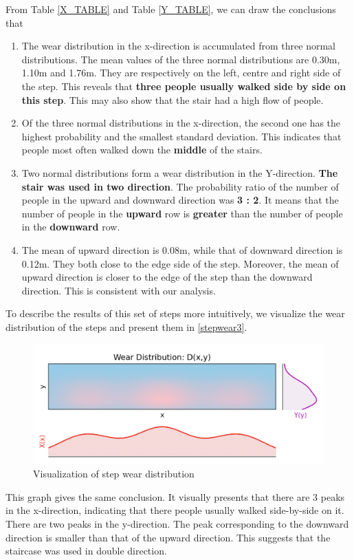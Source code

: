 \documentclass[12pt]{article}  %
\numberwithin{equation}{section} %
\begin{document}
From  Table \ref{X_TABLE} and Table \ref{Y_TABLE}, we can draw the conclusions that
\begin{enumerate}[\bfseries 1.]
	\setlength{\parsep}{0ex} %
	\setlength{\topsep}{-1ex} %
	\setlength{\itemsep}{0ex} %
	\item The wear distribution in the x-direction is accumulated from three normal distributions. The mean values of the three normal distributions are 0.30m, 1.10m and 1.76m. They are respectively on the left, centre and right side of the step. This reveals that \textbf{three people usually walked side by side on this step}. This may also show that the stair had a high flow of people.
	\item Of the three normal distributions in the x-direction, the second one has the highest probability and the smallest standard deviation. This indicates that people most often walked down the \textbf{middle} of the stairs. 
	\item Two normal distributions form a wear distribution in the Y-direction. \textbf{The stair was used in two direction}. The probability ratio of the number of people in the upward and downward direction was \textbf{3 : 2}. 
 It means that the number of people in the \textbf{upward} row is \textbf{greater} than the number of people in the \textbf{downward} row.
     \item The mean of upward direction is 0.08m, while that of downward direction is 0.12m. They both close to the edge side of the step. Moreover, the mean of upward direction is closer to the edge of the step than the downward direction. This is consistent with our analysis.
\end{enumerate}
\vspace{-1em}

To describe the results of this set of steps more intuitively, we visualize the wear distribution of the steps and present them in \autoref{stepwear3}.
\begin{figure}[H]
\vspace{-1em}
	\centering
\includegraphics[width=0.8\linewidth]{美赛Latex模板/stepwear3.png}
	\caption{Visualization of step wear distribution}
	\label{stepwear3}
 \vspace{-1em}
\end{figure}
This graph gives the same conclusion. It visually presents that there are 3 peaks in the x-direction, indicating that there people usually walked side-by-side on it. There are two peaks in the y-direction. The peak corresponding to the downward direction is smaller than that of the upward direction. This suggests that the staircase was used in double direction.
\end{document}
